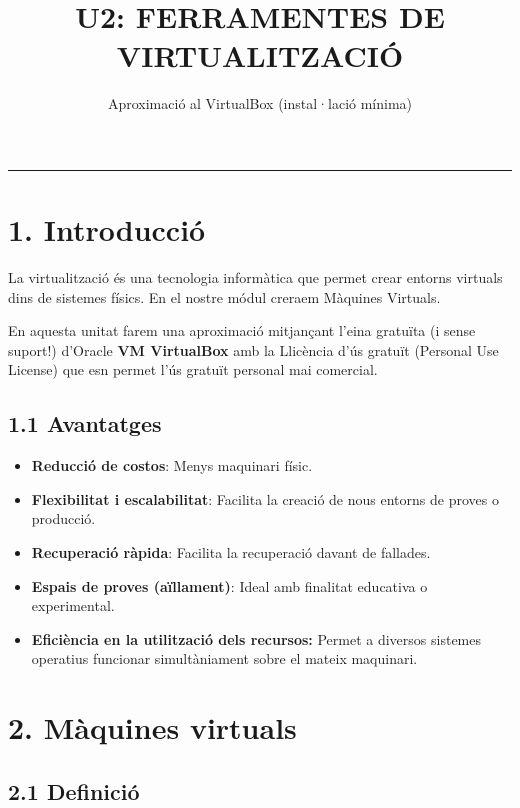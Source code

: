 \documentclass[
  spanish,
  12 pt,
  a4paper,
]{article}
\title{U2: FERRAMENTES DE VIRTUALITZACIÓ}
\subtitle{Aproximació al VirtualBox (instal·lació mínima)}
\author{}
\date{\vspace{-2.5em}}
\providecommand{\tightlist}{%
  \setlength{\itemsep}{0pt}\setlength{\parskip}{0pt}}
\begin{document}
\maketitle

\newpage
\renewcommand\tablename{Tabla}

\begin{center}\rule{0.5\linewidth}{0.5pt}\end{center}

\section{1. Introducció}\label{introducciuxf3}

La virtualització és una tecnologia informàtica que permet crear entorns
virtuals dins de sistemes físics. En el nostre módul creraem Màquines
Virtuals.

En aquesta unitat farem una aproximació mitjançant l'eina gratuïta (i
sense suport!) d'Oracle \textbf{VM VirtualBox} amb la Llicència d'ús
gratuït (Personal Use License) que esn permet l'ús gratuït personal mai
comercial.

\subsection{1.1 Avantatges}\label{avantatges}

\begin{itemize}
\tightlist
\item
  \textbf{Reducció de costos}: Menys maquinari físic.
\item
  \textbf{Flexibilitat i escalabilitat}: Facilita la creació de nous
  entorns de proves o producció.
\item
  \textbf{Recuperació ràpida}: Facilita la recuperació davant de
  fallades.
\item
  \textbf{Espais de proves (aïllament)}: Ideal amb finalitat educativa o
  experimental.
\item
  \textbf{Eficiència en la utilització dels recursos:} Permet a diversos
  sistemes operatius funcionar simultàniament sobre el mateix maquinari.
\end{itemize}

\section{2. Màquines virtuals}\label{muxe0quines-virtuals}

\subsection{2.1 Definició}\label{definiciuxf3}
\end{document}
